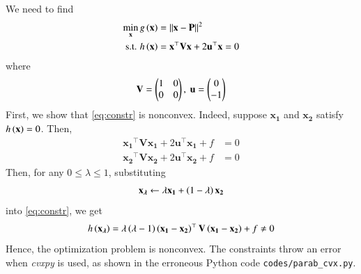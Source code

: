\documentclass[journal,12pt,twocolumn]{IEEEtran}
\renewcommand{\vec}[1]{\boldsymbol{\mathbf{#1}}}
\begin{document}
\begin{enumerate}
    \solution We need to find
    \begin{align}
        \min_{\vec{x}} g\brak{\vec{x}} &= \norm{\vec{x}-\vec{P}}^2 \label{eq:cost} \\
        \textrm{s.t. } h\brak{\vec{x}} &= \vec{x}^\top\vec{Vx} + 2\vec{u}^\top\vec{x} = 0 \label{eq:constr}
    \end{align}
    where
    \begin{align}
        \vec{V} = \myvec{1&0\\0&0},\ \vec{u} = \myvec{0\\-1}
    \end{align}
    First, we show that \eqref{eq:constr} is nonconvex. Indeed, suppose 
    $\vec{x_1}$ and $\vec{x_2}$ satisfy $h\brak{\vec{x}} = 0$. Then, 
    \begin{align}
        \vec{x_1}^\top\vec{Vx_1} + 2\vec{u}^\top\vec{x_1} + f &= 0 \label{eq:x1-parab} \\
        \vec{x_2}^\top\vec{Vx_2} + 2\vec{u}^\top\vec{x_2} + f &= 0 \label{eq:x2-parab}
    \end{align}
    Then, for any $0 \le \lambda \le 1$, substituting
    \begin{align}
        \vec{x_\lambda} \leftarrow \lambda\vec{x_1} + \brak{1-\lambda}\vec{x_2}
    \end{align}
    into \eqref{eq:constr}, we get
    \begin{align}
        h\brak{\vec{x_\lambda}} = \lambda\brak{\lambda-1}\brak{\vec{x_1}-\vec{x_2}}^\top\vec{V}\brak{\vec{x_1}-\vec{x_2}} + f \neq 0
        \label{eq:nonconvex}
    \end{align}
    Hence, the optimization problem is nonconvex. The constraints
    throw an error when \textit{cvxpy} is used, as shown in the erroneous Python code
    \texttt{codes/parab\_cvx.py}.


\end{enumerate}
\end{document}
